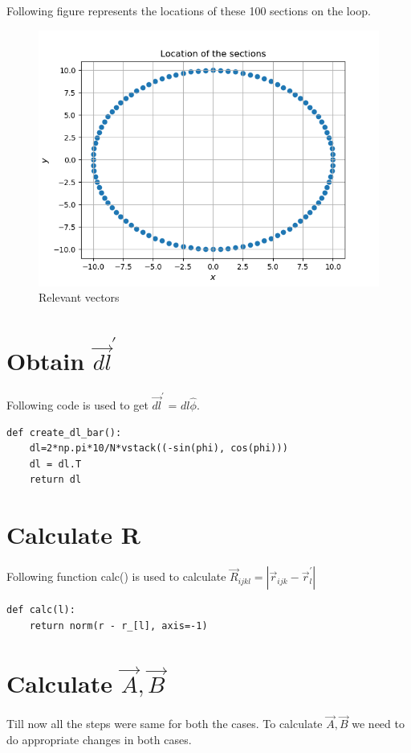 \documentclass[11pt, a4paper]{article}
\begin{document}
Following figure represents the  locations of these 100 sections on the loop.
\begin{figure}[!tbh]
   	\centering
   	\includegraphics[scale=0.5]{fig0.png}  %
   	\caption{Relevant vectors}
   	\label{fig:sample}
   \end{figure}


\section{Obtain $\vec{dl}^{'}$}
Following code is used to get $\vec{dl}^{'}$ = $dl \hat{\phi}$.
\begin{lstlisting}
def create_dl_bar():
	dl=2*np.pi*10/N*vstack((-sin(phi), cos(phi))) 
	dl = dl.T
	return dl
\end{lstlisting}

\section{Calculate R}
Following function calc() is used to calculate $\vec{R}_{ijkl} = |\vec{r}_{ijk} - \vec{r}^{'}_{l}|$
\begin{lstlisting}
def calc(l):
	return norm(r - r_[l], axis=-1)
\end{lstlisting}

\section{Calculate $\vec{A}, \vec{B}$}
Till now all the steps were same for both the cases. To calculate $\vec{A}, \vec{B}$ we need to do appropriate changes in both cases.
\end{document}
